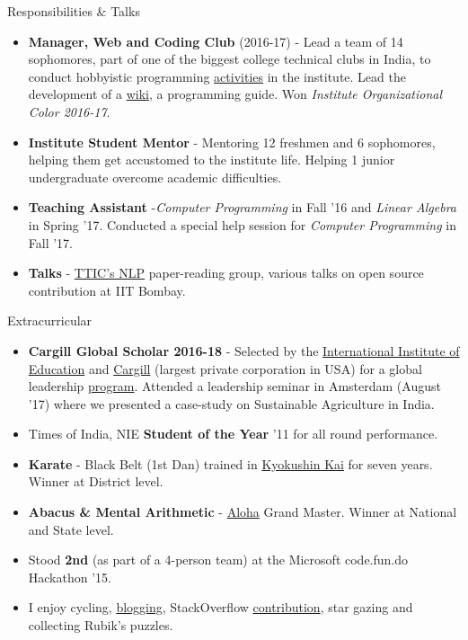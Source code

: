 \documentclass{resume} %
\begin{document}
\begin{rSection}{Responsibilities \& Talks}
\begin{itemize}[leftmargin=*]
\itemsep -0.5em 
\item \textbf{Manager, Web and Coding Club} (2016-17) - Lead a team of 14 sophomores, part of one of the biggest college technical clubs in India, to conduct hobbyistic programming \href{http://wncc-iitb.org/wiki/index.php/Event_Resources}{activities} in the institute. Lead the development of a \href{http://wncc-iitb.org/wiki}{wiki}, a programming guide.  Won \textit{Institute Organizational Color 2016-17}.
\item \textbf{Institute Student Mentor} - Mentoring 12 freshmen and 6 sophomores, helping them get accustomed to the institute life. Helping 1 junior undergraduate overcome academic difficulties.
\item \textbf{Teaching Assistant} -\textit{Computer Programming} in Fall '16 and \textit{Linear Algebra} in Spring '17. Conducted a special help session for \textit{Computer Programming} in Fall '17.
\item \textbf{Talks} - \href{http://ttic.uchicago.edu/~klivescu/SLATTIC/}{TTIC's NLP} paper-reading group, various talks on open source contribution at IIT Bombay.
\end{itemize}
\end{rSection}
\vspace*{-1mm}
\begin{rSection}{Extracurricular}
\begin{itemize}[leftmargin=*]
\itemsep -0.5em 
\item \textbf{Cargill Global Scholar 2016-18} - Selected by the \href{https://en.wikipedia.org/wiki/Institute_of_International_Education}{International Institute of Education} and \href{https://en.wikipedia.org/wiki/Cargill}{Cargill} (largest private corporation in USA) for a global leadership \href{https://www.cargillglobalscholars.com/}{program}. Attended a leadership seminar in Amsterdam (August '17) where we presented a case-study on Sustainable Agriculture in India.
\item Times of India, NIE \textbf{Student of the Year} '11 for all round performance.
\item \textbf{Karate} - Black Belt (1st Dan) trained in \href{https://en.wikipedia.org/wiki/Kyokushin}{Kyokushin Kai} for seven years. Winner at District level.
\item \textbf{Abacus \& Mental Arithmetic} - \href{http://alohama.com/}{Aloha} Grand Master. Winner at National and State level.
\item Stood \textbf{2nd} (as part of a 4-person team) at the Microsoft code.fun.do Hackathon ’15.
\item I enjoy cycling, \href{http://martiansideofthemoon.github.io/archive.html}{blogging}, StackOverflow \href{https://stackoverflow.com/users/5080995/martianwars}{contribution}, star gazing and collecting Rubik's puzzles.
\end{itemize}
\end{rSection}
\end{document}
